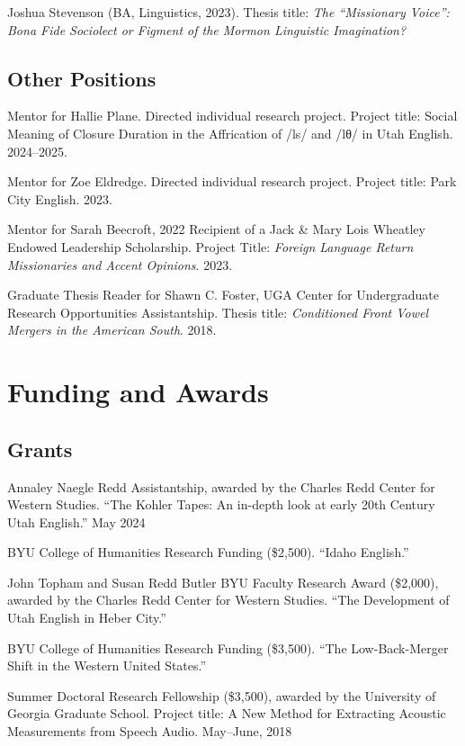 \documentclass[
]{article}
\begin{document}
Joshua Stevenson (BA, Linguistics, 2023). Thesis title: \emph{The
``Missionary Voice'': Bona Fide Sociolect or Figment of the Mormon
Linguistic Imagination?}

\hypertarget{other-positions}{%
\subsection{Other Positions}\label{other-positions}}

Mentor for Hallie Plane. Directed individual research project. Project
title: Social Meaning of Closure Duration in the Affrication of /ls/ and
/lθ/ in Utah English. 2024--2025.

Mentor for Zoe Eldredge. Directed individual research project. Project
title: Park City English. 2023.

Mentor for Sarah Beecroft, 2022 Recipient of a Jack \& Mary Lois
Wheatley Endowed Leadership Scholarship. Project Title: \emph{Foreign
Language Return Missionaries and Accent Opinions}. 2023.

Graduate Thesis Reader for Shawn C. Foster, UGA Center for Undergraduate
Research Opportunities Assistantship. Thesis title: \emph{Conditioned
Front Vowel Mergers in the American South}. 2018.

\hypertarget{funding-and-awards}{%
\section{Funding and Awards}\label{funding-and-awards}}

\hypertarget{grants}{%
\subsection{Grants}\label{grants}}

Annaley Naegle Redd Assistantship, awarded by the Charles Redd Center
for Western Studies. ``The Kohler Tapes: An in-depth look at early 20th
Century Utah English.'' May 2024

BYU College of Humanities Research Funding (\$2,500). ``Idaho English.''

John Topham and Susan Redd Butler BYU Faculty Research Award (\$2,000),
awarded by the Charles Redd Center for Western Studies. ``The
Development of Utah English in Heber City.''

BYU College of Humanities Research Funding (\$3,500). ``The
Low-Back-Merger Shift in the Western United States.''

Summer Doctoral Research Fellowship (\$3,500), awarded by the University
of Georgia Graduate School. Project title: A New Method for Extracting
Acoustic Measurements from Speech Audio. May--June, 2018
\end{document}
